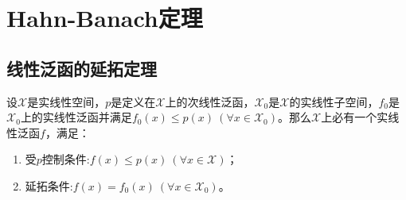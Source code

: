 \documentclass[../../main.tex]{subfiles}%
\begin{document}
\section{Hahn-Banach定理}

\subsection{线性泛函的延拓定理}

\begin{theorem}\label{theorem:泛函分析--实Hahn-Banach定理}
设$\mathscr{X}$是实线性空间，$p$是定义在$\mathscr{X}$上的次线性泛函，$\mathscr{X}_0$是$\mathscr{X}$的实线性子空间，$f_0$是$\mathscr{X}_0$上的实线性泛函并满足$f_0(x) \leqslant p(x) \ (\forall x \in \mathscr{X}_0)$。那么$\mathscr{X}$上必有一个实线性泛函$f$，满足：
\begin{enumerate}[(1)]
\item 受$p$控制条件:$f(x) \leqslant p(x) \ (\forall x \in \mathscr{X})$；

\item 延拓条件:$f(x) = f_0(x) \ (\forall x \in \mathscr{X}_0)$。
\end{enumerate}
\end{theorem}
\end{document}
